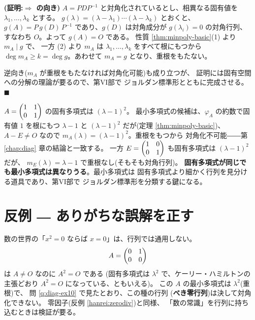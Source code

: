 \noindent\textbf{(証明:$\Rightarrow$ の向き)}\quad
$A = PDP^{-1}$ と対角化されているとし、相異なる固有値を
$\lambda_1, \dots, \lambda_k$ とする。
$g(\lambda) = (\lambda - \lambda_1)\cdots(\lambda - \lambda_k)$ とおくと、
$g(A) = P\,g(D)\,P^{-1}$ であり、$g(D)$ は対角成分が
$g(\lambda_i) = 0$ の対角行列、すなわち $O$。よって $g(A) = O$ である。
性質 \ref{thm:minpoly-basic}(1) より $m_A \mid g$ で、
一方 (2) より $m_A$ は $\lambda_1, \dots, \lambda_k$ をすべて根にもつから
$\deg m_A \ge k = \deg g$。あわせて $m_A = g$ となり、重根をもたない。

逆向き($m_A$ が重根をもたなければ対角化可能)も成り立つが、
証明には固有空間への分解の理論が要るので、第VI部で
ジョルダン標準形とともに完成させる。 $\blacksquare$

\begin{rei}\label{rei:ch-minpoly}
$A = \begin{pmatrix}1 & 1 \\ 0 & 1\end{pmatrix}$ の固有多項式は $(\lambda - 1)^2$。
最小多項式の候補は、$\varphi_A$ の約数で固有値 $1$ を根にもつ
$\lambda - 1$ と $(\lambda - 1)^2$ だが(定理 \ref{thm:minpoly-basic})、
$A - E \neq O$ なので $m_A(\lambda) = (\lambda - 1)^2$。重根をもつから
対角化不可能――第 \ref{chap:diag} 章の結論と一致する。
一方 $E = \begin{pmatrix}1 & 0 \\ 0 & 1\end{pmatrix}$ も固有多項式は $(\lambda - 1)^2$ だが、
$m_E(\lambda) = \lambda - 1$ で重根なし(そもそも対角行列)。
\textbf{固有多項式が同じでも最小多項式は異なりうる}。最小多項式は
固有多項式より細かく行列を見分ける道具であり、第VI部で
ジョルダン標準形を分類する鍵になる。
\end{rei}

\section{反例 ― ありがちな誤解を正す}

\begin{hanrei}[$A^2 = O$ でも $A = O$ とは限らない]\label{hanrei:ch-nilpotent}
数の世界の「$x^2 = 0$ ならば $x = 0$」は、行列では通用しない。
\[
A = \begin{pmatrix}0 & 1 \\ 0 & 0\end{pmatrix}
\]
は $A \neq O$ なのに $A^2 = O$ である
(固有多項式は $\lambda^2$ で、ケーリー・ハミルトンの主張どおり
$A^2 = O$ になっている、ともいえる)。
この $A$ の最小多項式は $\lambda^2$(重根)で、
問 \ref{q:diag-ex10} で見たとおり、この種の行列
(\textbf{べき零行列})は決して対角化できない。
零因子(反例 \ref{hanrei:zerodiv})と同様、
「数の常識」を行列に持ち込むときは検証が要る。
\end{hanrei}

